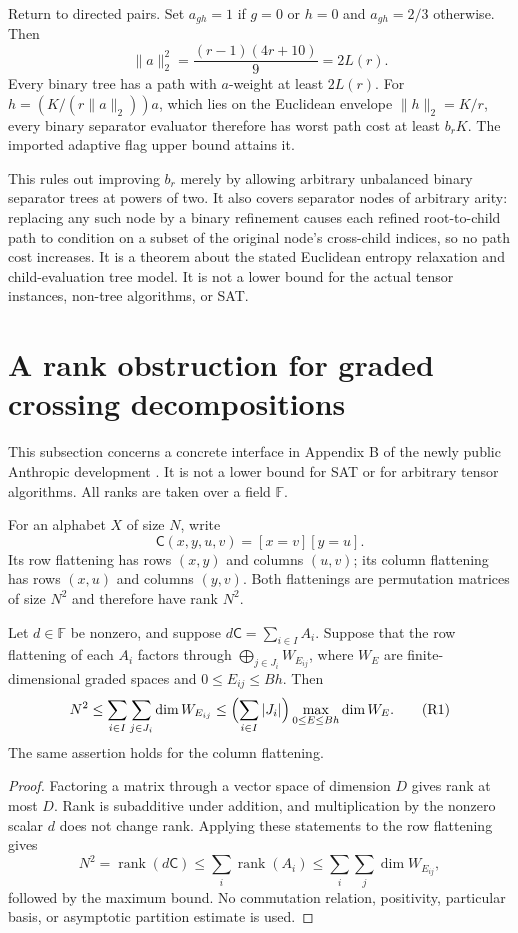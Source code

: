 Return to directed pairs. Set $a_{gh}=1$ if $g=0$ or $h=0$ and $a_{gh}=2/3$
otherwise. Then
\[
 \|a\|_2^2=\frac{(r-1)(4r+10)}9=2L(r).
\]
Every binary tree has a path with $a$-weight at least $2L(r)$.
For $h=(K/(r\|a\|_2))a$, which lies on the Euclidean envelope
$\|h\|_2=K/r$, every binary separator evaluator therefore has worst path
cost at least $b_rK$. The imported adaptive flag upper bound attains it.

This rules out improving $b_r$ merely by allowing arbitrary unbalanced
binary separator trees at powers of two. It also covers separator nodes
of arbitrary arity: replacing any such node by a binary refinement causes
each refined root-to-child path to condition on a subset of the original
node's cross-child indices, so no path cost increases. It is a theorem about the stated
Euclidean entropy relaxation and child-evaluation tree model. It is not
a lower bound for the actual tensor instances, non-tree algorithms, or SAT.


\section{A rank obstruction for graded crossing decompositions}
\label{sec:graded-window}

This subsection concerns a concrete interface in Appendix B of the newly
public Anthropic development \cite{anthropic-paper}.  It is not a lower bound for SAT or for
arbitrary tensor algorithms.  All ranks are taken over a field $\mathbb F$.

For an alphabet $X$ of size $N$, write
\[
 \mathsf C(x,y,u,v)=[x=v][y=u].
\]
Its row flattening has rows $(x,y)$ and columns $(u,v)$; its column
flattening has rows $(x,u)$ and columns $(y,v)$.  Both flattenings are
permutation matrices of size $N^2$ and therefore have rank $N^2$.

\begin{proposition}
Let $d\in\mathbb F$ be nonzero, and suppose
$d\mathsf C=\sum_{i\in I}A_i$.
Suppose that the row flattening of each $A_i$ factors through
$\bigoplus_{j\in J_i}W_{E_{ij}}$, where $W_E$ are finite-dimensional
graded spaces and $0\le E_{ij}\le Bh$.
Then
\[
 N^2\le \sum_{i\in I}\sum_{j\in J_i}\dim W_{E_{ij}}
 \le \Bigl(\sum_{i\in I}|J_i|\Bigr)
        \max_{0\le E\le Bh}\dim W_E.                 \tag{R1}
\]
The same assertion holds for the column flattening.
\end{proposition}

\begin{proof}
Factoring a matrix through a vector space of dimension $D$ gives rank at
most $D$.  Rank is subadditive under addition, and multiplication by the
nonzero scalar $d$ does not change rank.  Applying these statements to the
row flattening gives
\[
 N^2=\operatorname{rank}(d\mathsf C)
 \le\sum_i\operatorname{rank}(A_i)
 \le\sum_i\sum_j\dim W_{E_{ij}},
\]
followed by the maximum bound.  No commutation relation, positivity,
particular basis, or asymptotic partition estimate is used.
\end{proof}

